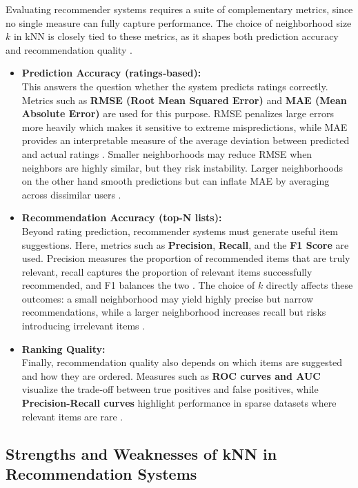 \documentclass[
  12pt]{article}
\begin{document}
Evaluating recommender systems requires a suite of complementary
metrics, since no single measure can fully capture performance. The
choice of neighborhood size \(k\) in kNN is closely tied to these
metrics, as it shapes both prediction accuracy and recommendation
quality \citep{nikolakopoulos2021}.

\begin{itemize}
\item
  \textbf{Prediction Accuracy (ratings‑based):}\\
  This answers the question whether the system predicts ratings
  correctly. Metrics such as \textbf{RMSE (Root Mean Squared Error)} and
  \textbf{MAE (Mean Absolute Error)} are used for this purpose. RMSE
  penalizes large errors more heavily which makes it sensitive to
  extreme mispredictions, while MAE provides an interpretable measure of
  the average deviation between predicted and actual ratings
  \citep{aggarwal2016}. Smaller neighborhoods may reduce RMSE when
  neighbors are highly similar, but they risk instability. Larger
  neighborhoods on the other hand smooth predictions but can inflate MAE
  by averaging across dissimilar users \citep{dsm_biasvariance}.
\item
  \textbf{Recommendation Accuracy (top-N lists):}\\
  Beyond rating prediction, recommender systems must generate useful
  item suggestions. Here, metrics such as \textbf{Precision},
  \textbf{Recall}, and the \textbf{F1 Score} are used. Precision
  measures the proportion of recommended items that are truly relevant,
  recall captures the proportion of relevant items successfully
  recommended, and F1 balances the two \citep{aggarwal2016}. The choice
  of \(k\) directly affects these outcomes: a small neighborhood may
  yield highly precise but narrow recommendations, while a larger
  neighborhood increases recall but risks introducing irrelevant items
  \citep{dsm_biasvariance, linkedin_knn}.
\item
  \textbf{Ranking Quality:}\\
  Finally, recommendation quality also depends on which items are
  suggested and how they are ordered. Measures such as \textbf{ROC
  curves and AUC} visualize the trade‑off between true positives and
  false positives, while \textbf{Precision-Recall curves} highlight
  performance in sparse datasets where relevant items are rare
  \citep{aggarwal2016}.
\end{itemize}

\subsection{\texorpdfstring{\textbf{Strengths and Weaknesses of kNN in
Recommendation
Systems}}{Strengths and Weaknesses of kNN in Recommendation Systems}}\label{strengths-and-weaknesses-of-knn-in-recommendation-systems}
\end{document}
